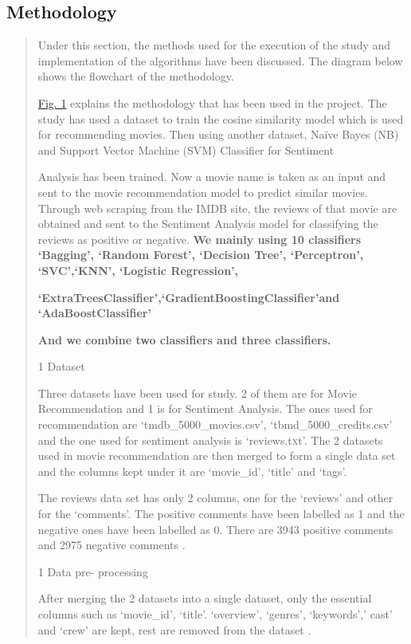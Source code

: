 \documentclass[
]{article}
\begin{document}
\hypertarget{methodology}{%
\subsection{Methodology}\label{methodology}}

\begin{quote}
Under this section, the methods used for the execution of the study and
implementation of the algorithms have been discussed. The diagram below
shows the ﬂowchart of the methodology.

\protect\hyperlink{_bookmark3}{Fig. 1} explains the methodology that has
been used in the project. The study has used a dataset to train the
cosine similarity model which is used for recommending movies. Then
using another dataset, Naïve Bayes (NB) and Support Vector Machine (SVM)
Classiﬁer for Sentiment

Analysis has been trained. Now a movie name is taken as an input and
sent to the movie recommendation model to predict similar movies.
Through web scraping from the IMDB site, the reviews of that movie are
obtained and sent to the Sentiment Analysis model for classifying the
reviews as positive or negative. \textbf{We mainly using 10 classifiers
`Bagging', `Random Forest', `Decision Tree', `Perceptron', `SVC',`KNN',
`Logistic Regression',}

\textbf{`ExtraTreesClassifier',`GradientBoostingClassifier'and
`AdaBoostClassifier'}

\textbf{And we combine two classifiers and three classifiers.}

1 Dataset

Three datasets have been used for study. 2 of them are for Movie
Recommendation and 1 is for Sentiment Analysis. The ones used for
recommendation are `tmdb\_5000\_movies.csv', `tbmd\_5000\_credits.csv'
and the one used for sentiment analysis is `reviews.t\textsc{x}t'. The 2
datasets used in movie recommendation are then merged to form a single
data set and the columns kept under it are `movie\_id', `title' and
`tags'.

The reviews data set has only 2 columns, one for the `reviews' and other
for the `comments'. The positive comments have been labelled as 1 and
the negative ones have been labelled as 0. There are 3943 positive
comments and 2975 negative comments .

1 Data pre- processing

After merging the 2 datasets into a single dataset, only the essential
columns such as `movie\_id', `title'. `overview', `genres', `keywords','
cast' and `crew' are kept, rest are removed from the dataset .


\end{quote}
\end{document}
